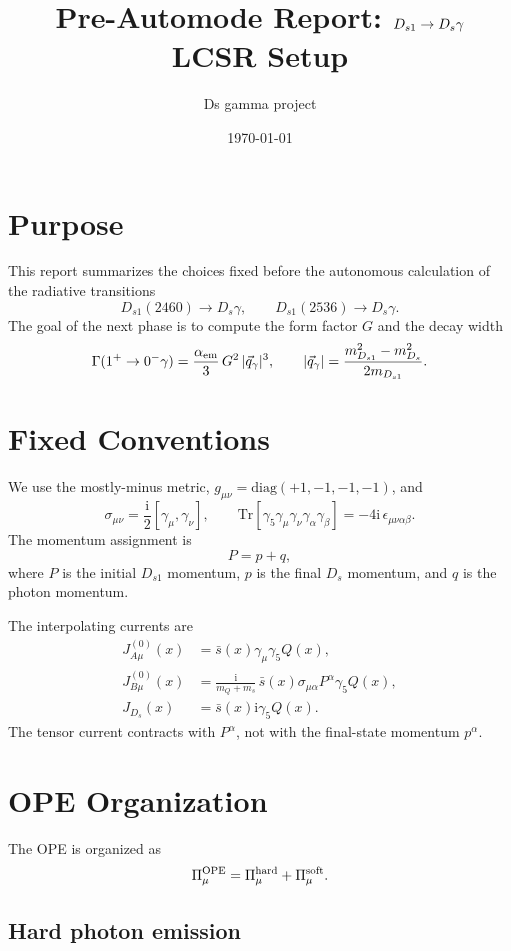 \documentclass[11pt]{article}
\title{Pre-Automode Report: $\Dsone\to\Ds\gamma$ LCSR Setup}
\author{Ds gamma project}
\date{\today}
\newcommand{\Ds}{D_s}
\newcommand{\Dsone}{D_{s1}}
\newcommand{\ii}{\mathrm{i}}
\newcommand{\Tr}{\mathrm{Tr}}
\begin{document}
\maketitle

\section{Purpose}

This report summarizes the choices fixed before the autonomous calculation of
the radiative transitions
\[
  \Dsone(2460)\to\Ds\gamma,\qquad
  \Dsone(2536)\to\Ds\gamma .
\]
The goal of the next phase is to compute the form factor $G$ and the decay
width
\[
  \Gamma(1^+\to 0^-\gamma)=\frac{\alpha_{\rm em}}{3}\,G^2\,|\vec q_\gamma|^3,
  \qquad
  |\vec q_\gamma|
  =
  \frac{m_{\Dsone}^2-m_{\Ds}^2}{2m_{\Dsone}} .
\]

\section{Fixed Conventions}

We use the mostly-minus metric, $g_{\mu\nu}=\mathrm{diag}(+1,-1,-1,-1)$, and
\[
  \sigma_{\mu\nu}=\frac{\ii}{2}[\gamma_\mu,\gamma_\nu],
  \qquad
  \Tr[\gamma_5\gamma_\mu\gamma_\nu\gamma_\alpha\gamma_\beta]
  =
  -4\ii\,\epsilon_{\mu\nu\alpha\beta}.
\]
The momentum assignment is
\[
  P=p+q,
\]
where $P$ is the initial $\Dsone$ momentum, $p$ is the final $\Ds$ momentum, and
$q$ is the photon momentum.

The interpolating currents are
\begin{align}
  J^{(0)}_{A\mu}(x)
  &= \bar s(x)\gamma_\mu\gamma_5 Q(x),\\
  J^{(0)}_{B\mu}(x)
  &= \frac{\ii}{m_Q+m_s}\,
     \bar s(x)\sigma_{\mu\alpha}P^\alpha\gamma_5Q(x),\\
  J_{\Ds}(x)
  &= \bar s(x)\ii\gamma_5Q(x).
\end{align}
The tensor current contracts with $P^\alpha$, not with the final-state momentum
$p^\alpha$.

\section{OPE Organization}

The OPE is organized as
\[
  \Pi_\mu^{\rm OPE}
  =
  \Pi_\mu^{\rm hard}
  +
  \Pi_\mu^{\rm soft}.
\]

\subsection{Hard photon emission}
\end{document}
